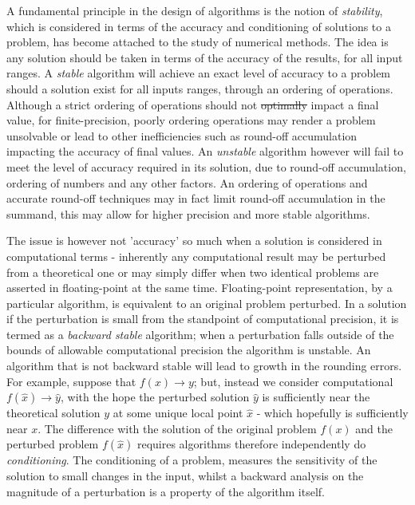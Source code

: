 \documentclass[7pt]{article}
\begin{document}
A fundamental principle in the design of algorithms is the notion of \emph{stability}, which is considered in terms of the accuracy and  conditioning of solutions to a problem, has become attached to the study of numerical methods. The idea is any solution should be taken in terms of the accuracy of the results, for all input ranges. A \emph{stable} algorithm will achieve an exact level of accuracy to a problem should a solution exist for all inputs ranges, through an ordering of operations. Although a strict ordering of operations should not \st{optimally} impact a final value, for finite-precision, poorly ordering operations may render a problem unsolvable or lead to other inefficiencies such as round-off accumulation impacting the accuracy of final values. An \emph{unstable} algorithm however will fail to meet the level of accuracy required in its solution, due to round-off accumulation, ordering of numbers and any other factors. An ordering of operations and accurate round-off techniques may in fact limit round-off accumulation in the summand, this may allow for higher precision and more stable algorithms. 

 The issue is however not 'accuracy' so much when a solution is considered in computational terms - inherently any computational result may be perturbed from a theoretical one or may simply differ when two identical problems are asserted in floating-point at the same time. Floating-point representation, by a particular algorithm, is equivalent to an original problem perturbed. In a solution if the perturbation is small from the standpoint of computational precision, it is termed as a \emph{backward stable} algorithm; when a perturbation falls outside of the bounds of allowable computational precision the algorithm is unstable. An algorithm that is not backward stable will lead to growth in the rounding errors. For example, suppose that $f(x) \rightarrow y$; but, instead we consider computational $f(\hat{x}) \rightarrow \hat{y}$, with the hope the perturbed solution $\hat{y}$ is sufficiently near the theoretical solution $y$ at some unique local point $\hat{x}$ - which hopefully is sufficiently near $x$. The difference with the solution of the original problem $f(x)$ and the perturbed problem $f(\hat{x})$ requires algorithms therefore independently do \emph{conditioning}. The conditioning of a problem, measures the sensitivity of the solution to small changes in the input, whilst a backward analysis on the magnitude of a perturbation is a property of the algorithm itself.
\end{document}
